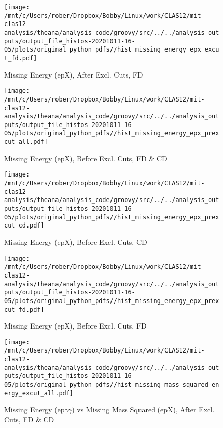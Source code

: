 \documentclass{article}
\begin{document}
\begin{landscape}
\begin{figure}[h]
        \texttt{[image: /mnt/c/Users/rober/Dropbox/Bobby/Linux/work/CLAS12/mit-clas12-analysis/theana/analysis\_code/groovy/src/../../analysis\_outputs/output\_file\_histos-20201011-16-05/plots/original\_python\_pdfs//hist\_missing\_energy\_epx\_excut\_fd.pdf]}
        \captionsetup{textformat=empty,labelformat=blank}
        \caption{Missing Energy (epX), After Excl. Cuts, FD}
    \end{figure}
    \clearpage
    
    \begin{figure}[h]
        \centering

        \texttt{[image: /mnt/c/Users/rober/Dropbox/Bobby/Linux/work/CLAS12/mit-clas12-analysis/theana/analysis\_code/groovy/src/../../analysis\_outputs/output\_file\_histos-20201011-16-05/plots/original\_python\_pdfs//hist\_missing\_energy\_epx\_prexcut\_all.pdf]}
        \captionsetup{textformat=empty,labelformat=blank}
        \caption{Missing Energy (epX), Before Excl. Cuts, FD \& CD}
    \end{figure}
    \clearpage
    
    \begin{figure}[h]
        \centering

        \texttt{[image: /mnt/c/Users/rober/Dropbox/Bobby/Linux/work/CLAS12/mit-clas12-analysis/theana/analysis\_code/groovy/src/../../analysis\_outputs/output\_file\_histos-20201011-16-05/plots/original\_python\_pdfs//hist\_missing\_energy\_epx\_prexcut\_cd.pdf]}
        \captionsetup{textformat=empty,labelformat=blank}
        \caption{Missing Energy (epX), Before Excl. Cuts, CD}
    \end{figure}
    \clearpage
    
    \begin{figure}[h]
        \centering

        \texttt{[image: /mnt/c/Users/rober/Dropbox/Bobby/Linux/work/CLAS12/mit-clas12-analysis/theana/analysis\_code/groovy/src/../../analysis\_outputs/output\_file\_histos-20201011-16-05/plots/original\_python\_pdfs//hist\_missing\_energy\_epx\_prexcut\_fd.pdf]}
        \captionsetup{textformat=empty,labelformat=blank}
        \caption{Missing Energy (epX), Before Excl. Cuts, FD}
    \end{figure}
    \clearpage
    
    \begin{figure}[h]
        \centering

        \texttt{[image: /mnt/c/Users/rober/Dropbox/Bobby/Linux/work/CLAS12/mit-clas12-analysis/theana/analysis\_code/groovy/src/../../analysis\_outputs/output\_file\_histos-20201011-16-05/plots/original\_python\_pdfs//hist\_missing\_mass\_squared\_energy\_excut\_all.pdf]}
        \captionsetup{textformat=empty,labelformat=blank}
        \caption{Missing Energy (ep$\gamma$$\gamma$) vs Missing Mass Squared (epX), After Excl. Cuts, FD \& CD}
    \end{figure}
    \clearpage
    

\end{landscape}
\end{document}
